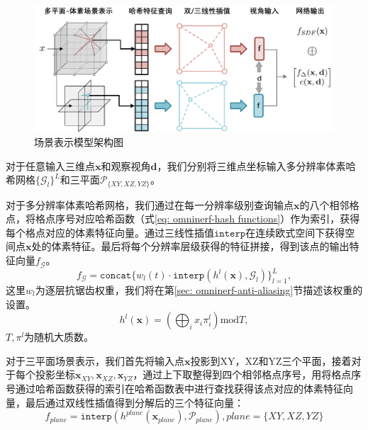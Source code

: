 \begin{figure}[ht]
    \centering
    \includegraphics[width=\textwidth]{undergraduate-thesis/images/omni-nerf/omninerf-scene-representation.pdf}
    \caption{场景表示模型架构图}
    \label{fig:omninerf-scene-representation}
\end{figure}

对于任意输入三维点$\mathbf{x}$和观察视角$\mathbf{d}$，我们分别将三维点坐标输入多分辨率体素哈希网格$\{\mathcal{G}_l\}^L$和三平面$\mathcal{P}_{\{XY,XZ,YZ\}}$。

对于多分辨率体素哈希网格，我们通过在每一分辨率级别查询输点$\mathbf{x}$的八个相邻格点，将格点序号对应哈希函数（式\ref{eq: omninerf-hash functions}）作为索引，获得每个格点对应的体素特征向量。通过三线性插值$\mathtt{interp}$在连续欧式空间下获得空间点$\mathbf{x}$处的体素特征。最后将每个分辨率层级获得的特征拼接，得到该点的输出特征向量$f_{\mathcal{G}}$。
\begin{equation}
    f_{\mathcal{G}} = \mathtt{concat}\{w_l(t)\cdot\mathtt{interp}(h^l(\mathbf{x}), \mathcal{G}_l)\}_{l=1}^L,
\end{equation}
这里$w_l$为逐层抗锯齿权重，我们将在第\ref{sec: omninerf-anti-aliasing}节描述该权重的设置。
\begin{equation}
    h^l(\mathbf{x}) = \left(\bigoplus_{i}x_i\pi_i^l\right) \text{mod} T,
    \label{eq: omninerf-hash functions}
\end{equation}
$T, \pi^l$为随机大质数。

对于三平面场景表示，我们首先将输入点$\mathbf{x}$投影到XY，XZ和YZ三个平面，接着对于每个投影坐标$\mathbf{x}_{XY},\mathbf{x}_{XZ},\mathbf{x}_{YZ}$，通过上下取整得到四个相邻格点序号，用将格点序号通过哈希函数获得的索引在哈希函数表中进行查找获得该点对应的体素特征向量，最后通过双线性插值得到分解后的三个特征向量：
\begin{equation}
    f_{plane} = \mathtt{interp}(h^{plane}(\mathbf{x}_{plane}), \mathcal{P}_{plane})
    ,plane=\{XY,XZ,YZ\}
\end{equation}

